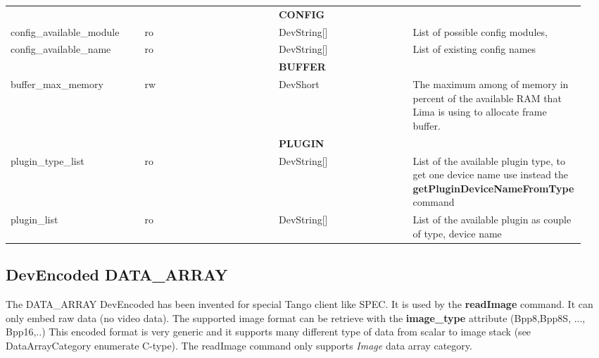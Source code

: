 \documentclass[letterpaper,10pt,english]{sphinxmanual}
\begin{document}
\begin{longtable}{|p{0.237\linewidth}|p{0.237\linewidth}|p{0.237\linewidth}|p{0.237\linewidth}|}
 & 

 & 

 & 

\\
\hline

 & 

 & 
\textbf{CONFIG}
 & 

\\
\hline
config\_available\_module
 & 
ro
 & 
DevString{[}{]}
 & 
List of possible config modules,
\\
\hline
config\_available\_name
 & 
ro
 & 
DevString{[}{]}
 & 
List of existing config names
\\
\hline

 & 

 & 
\textbf{BUFFER}
 & 

\\
\hline
buffer\_max\_memory
 & 
rw
 & 
DevShort
 & 
The maximum among of memory in percent of the available RAM
that Lima is using to allocate frame buffer.
\\
\hline

 & 

 & 
\textbf{PLUGIN}
 & 

\\
\hline
plugin\_type\_list
 & 
ro
 & 
DevString{[}{]}
 & 
List of the available plugin type, to get one device name
use instead the \textbf{getPluginDeviceNameFromType} command
\\
\hline
plugin\_list
 & 
ro
 & 
DevString{[}{]}
 & 
List of the available plugin as couple of type, device name
\\
\hline\end{longtable}



\subsection{DevEncoded DATA\_ARRAY}
\label{LimaDetector/limadetector:devencoded-data-array}\label{LimaDetector/limadetector:data-array-encoded}
The DATA\_ARRAY DevEncoded has been invented for special Tango client like SPEC. It is used by the \textbf{readImage} command.
It can only embed raw data (no video data). The supported image format can be retrieve with the \textbf{image\_type} attribute (Bpp8,Bpp8S, ..., Bpp16,..)
This encoded format is very generic and it supports many different type of data from scalar to image stack (see DataArrayCategory enumerate C-type).
The readImage command only supports  \emph{Image} data array category.
\end{document}

